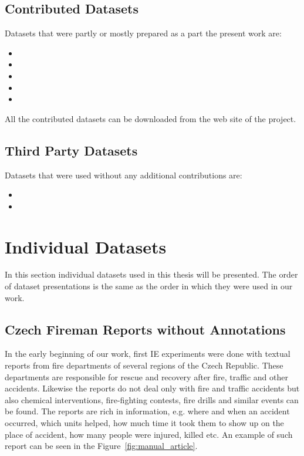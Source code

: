 \subsection{Contributed Datasets}
Datasets that were partly or mostly prepared as a part the present work are:


\begin{itemize}
	\item {}
	\item {}
	\item {}
	\item {}
	\item {}
\end{itemize}

All the contributed datasets can be downloaded from the web site of the project. 
\subsection{Third Party Datasets}

Datasets that were used without any additional contributions are:

\begin{itemize}
	\item {}
	\item {}
\end{itemize}


\section{Individual Datasets}
In this section individual datasets used in this thesis will be presented. The order of dataset presentations is the same as the order in which they were used in our work.

\subsection{Czech Fireman Reports without Annotations} \label{sec:data_fireman_without}
In the early beginning of our work, first IE experiments were done with textual reports from fire departments of several regions of the Czech Republic. These departments are responsible for rescue and recovery after fire, traffic and other accidents. Likewise the reports do not deal only with fire and traffic accidents but also chemical interventions, fire-fighting contests, fire drills and similar events can be found. The reports are rich in information, e.g. where and when an accident occurred, which units helped, how much time it took them to show up on the place of accident, how many people were injured, killed etc. An example of such report can be seen in the Figure~\ref{fig:manual_article}.


